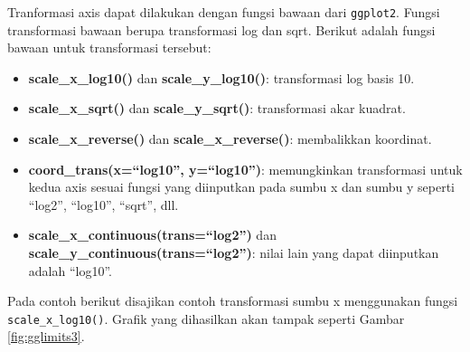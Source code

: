 \documentclass[]{book}
\newenvironment{Shaded}{\begin{snugshade}}{\end{snugshade}}
\newcommand{\KeywordTok}[1]{\textcolor[rgb]{0.13,0.29,0.53}{\textbf{#1}}}
\newcommand{\DataTypeTok}[1]{\textcolor[rgb]{0.13,0.29,0.53}{#1}}
\newcommand{\DecValTok}[1]{\textcolor[rgb]{0.00,0.00,0.81}{#1}}
\newcommand{\StringTok}[1]{\textcolor[rgb]{0.31,0.60,0.02}{#1}}
\newcommand{\CommentTok}[1]{\textcolor[rgb]{0.56,0.35,0.01}{\textit{#1}}}
\newcommand{\OperatorTok}[1]{\textcolor[rgb]{0.81,0.36,0.00}{\textbf{#1}}}
\newcommand{\NormalTok}[1]{#1}
\providecommand{\tightlist}{%
  \setlength{\itemsep}{0pt}\setlength{\parskip}{0pt}}
\begin{document}
Tranformasi axis dapat dilakukan dengan fungsi bawaan dari
\texttt{ggplot2}. Fungsi transformasi bawaan berupa transformasi log dan
sqrt. Berikut adalah fungsi bawaan untuk transformasi tersebut:

\begin{itemize}
\tightlist
\item
  \textbf{scale\_x\_log10()} dan \textbf{scale\_y\_log10()}:
  transformasi log basis 10.
\item
  \textbf{scale\_x\_sqrt()} dan \textbf{scale\_y\_sqrt()}: transformasi
  akar kuadrat.
\item
  \textbf{scale\_x\_reverse()} dan \textbf{scale\_x\_reverse()}:
  membalikkan koordinat.
\item
  \textbf{coord\_trans(x=``log10'', y=``log10'')}: memungkinkan
  transformasi untuk kedua axis sesuai fungsi yang diinputkan pada sumbu
  x dan sumbu y seperti ``log2'', ``log10'', ``sqrt'', dll.
\item
  \textbf{scale\_x\_continuous(trans=``log2'')} dan
  \textbf{scale\_y\_continuous(trans=``log2'')}: nilai lain yang dapat
  diinputkan adalah ``log10''.
\end{itemize}

Pada contoh berikut disajikan contoh transformasi sumbu x menggunakan
fungsi \texttt{scale\_x\_log10()}. Grafik yang dihasilkan akan tampak
seperti Gambar \ref{fig:gglimits3}.

\begin{Shaded}
\end{Shaded}
\end{document}
